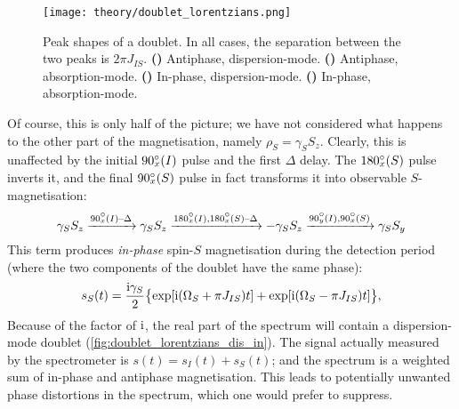 \begin{figure}[htbp]
    \centering
    \texttt{[image: theory/doublet\_lorentzians.png]}%
    {\label{fig:doublet_lorentzians_dis_anti}}%
    {\label{fig:doublet_lorentzians_abs_anti}}%
    {\label{fig:doublet_lorentzians_dis_in}}%
    {\label{fig:doublet_lorentzians_abs_in}}%
    \caption[Absorption- and dispersion-mode in-phase and antiphase doublets]{
        Peak shapes of a doublet.
        In all cases, the separation between the two peaks is $2\pi J_{IS}$.
        \textbf{()} Antiphase, dispersion-mode.
        \textbf{()} Antiphase, absorption-mode.
        \textbf{()} In-phase, dispersion-mode.
        \textbf{()} In-phase, absorption-mode.
    }
    \label{fig:doublet_lorentzians}
\end{figure}

Of course, this is only half of the picture; we have not considered what happens to the other part of the magnetisation, namely $\rho_S = \gamma_S S_z$.
Clearly, this is unaffected by the initial $\angang{90}{x}(I)$ pulse and the first $\Delta$ delay.
The $\angang{180}{x}(S)$ pulse inverts it, and the final $\angang{90}{x}(S)$ pulse in fact transforms it into observable $S$-magnetisation:
\begin{equation}
    \label{eq:inept_prodop_s}
    \gamma_S S_z \xrightarrow{\angang{90}{x}(I)\text{--}\Delta} \gamma_S S_z
    \xrightarrow{\angang{180}{x}(I),\angang{180}{x}(S)\text{--}\Delta} -\gamma_S S_z
    \xrightarrow{\angang{90}{y}(I),\angang{90}{x}(S)} \gamma_S S_y
\end{equation}
This term produces \textit{in-phase} spin-$S$ magnetisation during the detection period (where the two components of the doublet have the same phase):
\begin{equation}
    \label{eq:inept_fid_S}
    s_S(t) = \frac{\mathrm{i}\gamma_S}{2}\bigl\{\exp[\mathrm{i}(\Omega_S + \pi J_{IS})t] + \exp[\mathrm{i}(\Omega_S - \pi J_{IS})t]\bigr\},
\end{equation}
Because of the factor of $\mathrm{i}$, the real part of the spectrum will contain a dispersion-mode doublet (\cref{fig:doublet_lorentzians_dis_in}).
The signal actually measured by the spectrometer is $s(t) = s_I(t) + s_S(t)$; and the spectrum is a weighted sum of in-phase and antiphase magnetisation.
This leads to potentially unwanted phase distortions in the spectrum, which one would prefer to suppress.

